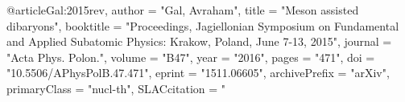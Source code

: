 @article{Gal:2015rev,
      author         = "Gal, Avraham",
      title          = "{Meson assisted dibaryons}",
      booktitle      = "{Proceedings, Jagiellonian Symposium on Fundamental and
                        Applied Subatomic Physics: Krakow, Poland, June 7-13,
                        2015}",
      journal        = "Acta Phys. Polon.",
      volume         = "B47",
      year           = "2016",
      pages          = "471",
      doi            = "10.5506/APhysPolB.47.471",
      eprint         = "1511.06605",
      archivePrefix  = "arXiv",
      primaryClass   = "nucl-th",
      SLACcitation   = "%
}